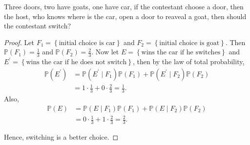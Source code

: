 \begin{eg}
    Three doors, two have goats, one have car, if the contestant choose a door, then the host, who knows where is the car, open a door to reaveal a goat, then should the contestant switch? 
\end{eg}

\begin{proof}
    Let \(F_1 = \left\{ \text{initial choice is car}  \right\} \) and \(F_2 = \left\{ \text{initial choice is goat}  \right\} \). Then \(\mathbb{P} (F_1) = \frac{1}{3}\) and \(\mathbb{P} (F_2) = \frac{2}{3}\). Now let \(E = \left\{ \text{wins the car if he switches}  \right\} \) and \(E^{\prime} = \left\{ \text{wins the car if he does not switch}  \right\} \), then by the law of total probability,
    \begin{align*}
        \mathbb{P} (E^{\prime} ) &= \mathbb{P} (E^{\prime} \mid F_1) \mathbb{P} (F_1) + \mathbb{P} (E^{\prime} \mid F_2) \mathbb{P} (F_2) \\
        &= 1 \cdot \frac{1}{3} + 0 \cdot \frac{2}{3} = \frac{1}{3}.
    \end{align*}       
    Also,
    \begin{align*}
        \mathbb{P} (E) &= \mathbb{P} (E \mid F_1) \mathbb{P} (F_1) + \mathbb{P} (E \mid F_2) \mathbb{P} (F_2) \\
        &= 0 \cdot \frac{1}{3} + 1 \cdot \frac{2}{3} = \frac{2}{3}.
    \end{align*}

    Hence, switching is a better choice.
\end{proof}


